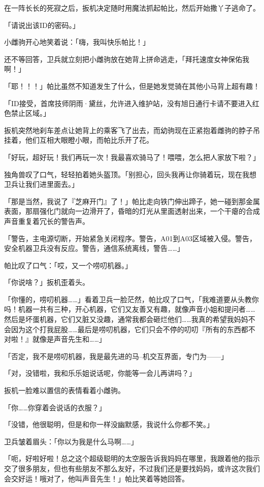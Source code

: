 在一阵长长的死寂之后，扳机决定随时用魔法抓起帕比，然后开始撒丫子逃命了。

「{\mtzh 请说出该ID的密码。}」

小雌驹开心地笑着说：「嗨，我叫快乐帕比！」

还不等回答，卫兵就立刻把小雌驹放在她背上拼命逃走，「拜托速度女神保佑我啊！」

「耶！！！」帕比虽然不知道发生了什么，但是她发觉骑在其他小马背上超有趣！

「{\mtzh ID接受，首席技师阴雨·黛丝，允许进入维护站，没有旭日通行卡请不要进入红色禁止区域。}」

扳机突然地刹车差点让她背上的乘客飞了出去，而幼驹现在正紧抱着雌驹的脖子吊挂着，他们互相大眼瞪小眼，而帕比乐开了花。

「好玩，超好玩！我们再玩一次！我最喜欢骑马了！喂喂，怎么把人家放下啦？」

独角兽叹了口气，轻轻拍着她头盔顶。「别担心，回头我再让你骑着玩，现在我想卫兵让我们进里面去。」

「那是当然，我说了『芝麻开门』了！」帕比走向铁门伸出蹄子，她一碰到那金属表面，那扇强化门就向一边滑开了，昏暗的灯光从里面透射出来，一个干瘪的合成声音重复着冗长的警告声。

「{\mtzh 警告，主电源切断，开始紧急关闭程序。警告，A01到A03区域被入侵。警告，安全机器卫兵没有反应。警告，通信系统离线，警告……}」

帕比叹了口气：「哎，又一个唠叨机器。」

「你说啥？」扳机歪着头。

「你懂的，唠叨机器……」看着卫兵一脸茫然，帕比叹了口气，「我难道要从头教你吗！机器一共有三种，开心机器，它们又友善又有趣，就像声音小姐和提问者……然后是坏蛋机器，它们又脏又没趣，通常我都会砸烂他们……我真的希望我妈妈不会因为这个打我屁股……最后是唠叨机器，它们只会不停的叨叨『所有的东西都不对啦！』就像是声音先生和……」

「{\mtzh 否定，我不是唠叨机器，我是最先进的马--机交互界面，专门为——}」

「对，没错啦，我和乐乐姐说话呢，你能等一会儿再讲吗？」

扳机一脸难以置信的表情看着小雌驹。

「你……你穿着会说话的衣服？」

「没错，他很聪明，但是和你一样没幽默感，我说什么你都不笑。」

卫兵皱着眉头：「你以为我是什么马啊……」

「呃，好啦好啦！总之这个超级聪明的太空服告诉我妈妈在哪里，我跟着他的指示交了很多朋友，但也有些朋友不那么友好，不过我们还是要找妈妈，或许这次我们会交好运！哦对了，他叫声音先生！」帕比笑着等她回答。

